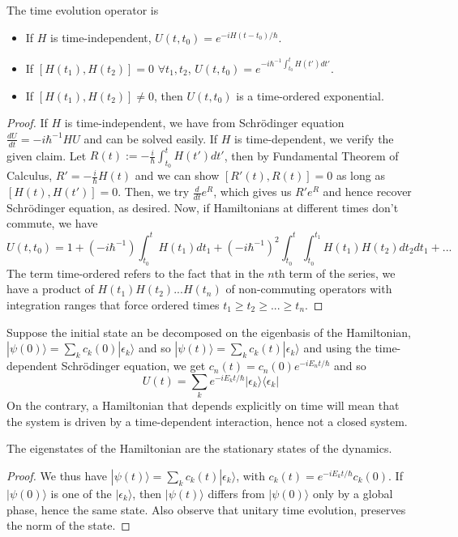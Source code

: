 \documentclass[a4paper]{article}
\begin{document}
\begin{thm}
The time evolution operator is
\begin{itemize}
    \item If $H$ is time-independent, $U(t,t_0)=e^{-iH(t-t_0)/\hbar}$.
    \item If $[H(t_1),H(t_2)]=0$ $\forall t_1,t_2$, $U(t,t_0)=e^{-i\hbar^{-1}\int_{t_0}^tH(t')dt'}$.
    \item If $[H(t_1),H(t_2)]\neq 0$, then $U(t,t_0)$ is a time-ordered exponential.
\end{itemize}
\end{thm}
\begin{proof}
If $H$ is time-independent, we have from Schr\"{o}dinger equation $\frac{dU}{dt}=-i\hbar^{-1}HU$ and can be solved easily. If $H$ is time-dependent, we verify the given claim. Let $R(t):=-\frac{i}{\hbar}\int_{t_0}^tH(t')dt'$, then by Fundamental Theorem of Calculus, $R'=-\frac{i}{\hbar}H(t)$ and we can show $[R'(t),R(t)]=0$ as long as $[H(t),H(t')]=0$. Then, we try $\frac{d}{dt}e^R$, which gives us $R'e^R$ and hence recover Schr\"{o}dinger equation, as desired. Now, if Hamiltonians at different times don't commute, we have
$$U(t,t_0)=1+(-i\hbar^{-1})\int_{t_0}^tH(t_1)dt_1+(-i\hbar^{-1})^2\int_{t_0}^t\int_{t_0}^{t_1}H(t_1)H(t_2)dt_2dt_1+...$$
The term time-ordered refers to the fact that in the $n$th term of the series, we have a product of $H(t_1)H(t_2)...H(t_n)$ of non-commuting operators with integration ranges that force ordered times $t_1\geq t_2\geq...\geq t_n$.
\end{proof}
\begin{eg}
Suppose the initial state an be decomposed on the eigenbasis of the Hamiltonian, $|\psi(0)\rangle=\sum_kc_k(0)|\epsilon_k\rangle$ and so $|\psi(t)\rangle=\sum_kc_k(t)|\epsilon_k\rangle$ and using the time-dependent Schr\"{o}dinger equation, we get $c_n(t)=c_n(0)e^{-iE_nt/\hbar}$ and so
$$U(t)=\sum_ke^{-iE_kt/\hbar}|\epsilon_k\rangle\langle\epsilon_k|$$
On the contrary, a Hamiltonian that depends explicitly on time will mean that the system is driven by a time-dependent interaction, hence not a closed system. 
\end{eg}
\begin{cor}
The eigenstates of the Hamiltonian are the stationary states of the dynamics.
\end{cor}
\begin{proof}
We thus have $|\psi(t)\rangle=\sum_kc_k(t)|\epsilon_k\rangle$, with $c_k(t)=e^{-iE_kt/\hbar}c_k(0)$. If $|\psi(0)\rangle$ is one of the $|\epsilon_k\rangle$, then $|\psi(t)\rangle$ differs from $|\psi(0)\rangle$ only by a global phase, hence the same state. Also observe that unitary time evolution, preserves the norm of the state.
\end{proof}
\end{document}
